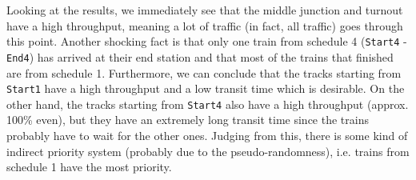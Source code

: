 \documentclass{article}
\begin{document}
Looking at the results, we immediately see that the middle junction and turnout have a high throughput, meaning a lot of traffic (in fact, all traffic) goes through this point. Another shocking fact is that only one train from schedule 4 (\texttt{Start4} - \texttt{End4}) has arrived at their end station and that most of the trains that finished are from schedule 1. Furthermore, we can conclude that the tracks starting from \texttt{Start1} have a high throughput and a low transit time which is desirable. On the other hand, the tracks starting from \texttt{Start4} also have a high throughput (approx. 100\% even), but they have an extremely long transit time since the trains probably have to wait for the other ones. Judging from this, there is some kind of indirect priority system (probably due to the pseudo-randomness), i.e. trains from schedule 1 have the most priority.
\end{document}
